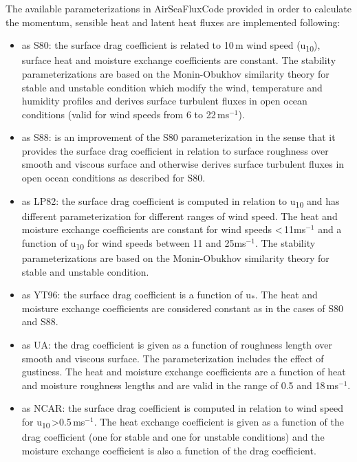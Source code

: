 \documentclass[letterpaper,10pt,english]{sphinxmanual}
\begin{document}
The available parameterizations in AirSeaFluxCode provided in order to calculate the momentum, sensible heat and latent heat fluxes are implemented following:
\begin{itemize}
\item \cite{Smith_1980} as S80: the surface drag coefficient is related to 10\,m wind speed (u\textsubscript{10}), surface heat and moisture exchange coefficients are constant. The stability parameterizations are based on the Monin-Obukhov similarity theory for stable and unstable condition which modify the wind, temperature and humidity profiles and derives surface turbulent fluxes in open ocean conditions (valid for wind speeds from 6 to 22\,ms$^{-1}$).

\item \cite{Smith_1988} as S88: is an improvement of the S80 parameterization in the sense that it provides the surface drag coefficient in relation to surface roughness over smooth and viscous surface and otherwise derives surface turbulent fluxes in open ocean conditions as described for S80.

\item  \cite{Large_Pond_1981,Large_Pond_1982} as LP82: the surface drag coefficient is computed in relation to u\textsubscript{10} and has different parameterization for different ranges of wind speed. The heat and moisture exchange coefficients are constant for wind speeds \textless\,11ms$^{-1}$ and a function of u\textsubscript{10} for wind speeds between 11 and 25ms$^{-1}$. The stability parameterizations are based on the Monin-Obukhov similarity theory for stable and unstable condition.

\item \cite{Yelland_Taylor_1996, Yelland_etal_1998} as YT96: the surface drag coefficient is a function of u\textsubscript{$\ast$}. The heat and moisture exchange coefficients are considered constant as in the cases of S80 and S88.

\item \cite{Zeng_etal_1998} as UA: the drag coefficient is given as a function of roughness length over smooth and viscous surface. The parameterization includes the effect of gustiness. The heat and moisture exchange coefficients are a function of heat and moisture roughness lengths and are valid in the range of 0.5 and 18\,ms$^{-1}$.

\item \cite{Large_Yeager_2004, Large_Yeager_2009} as NCAR: the surface drag coefficient is computed in relation to wind speed for u\textsubscript{10}\,\textgreater{}0.5\,ms$^{-1}$. The heat exchange coefficient is given as a function of the drag coefficient (one for stable and one for unstable conditions) and the moisture exchange coefficient is also a function of the drag coefficient.


\end{itemize}
\end{document}
